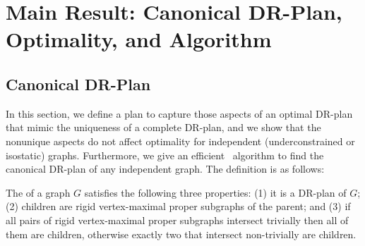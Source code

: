 \section{Main Result: Canonical DR-Plan, Optimality, and Algorithm}
\label{sec:DRP}



\subsection{Canonical DR-Plan}
In this section, we define a  plan to capture those aspects of an optimal DR-plan that mimic the  uniqueness of a complete DR-plan, and we show that the nonunique aspects do not affect optimality for independent (underconstrained or isostatic) graphs. Furthermore, we give an efficient \candrpcomplexity\ algorithm to find the canonical DR-plan of any independent graph. The definition is as follows:

\begin{definition}\label{def:canonical_drplan}
    The  of a graph $G$ satisfies the following three properties:
    (1) it is a DR-plan of $G$;
    (2) children are rigid vertex-maximal proper subgraphs of the parent; and
    (3) if all pairs of rigid vertex-maximal proper subgraphs intersect trivially then all of them are children, otherwise exactly two that intersect non-trivially are children.
\end{definition}

